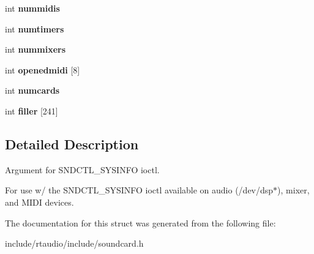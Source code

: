 \begin{DoxyCompactItemize}
\item 
int {\bfseries nummidis}\hypertarget{structoss__sysinfo_a9b22d422ebde2c7830ee392e934187c0}{}\label{structoss__sysinfo_a9b22d422ebde2c7830ee392e934187c0}

\item 
int {\bfseries numtimers}\hypertarget{structoss__sysinfo_ac17e56311498c6c9a1b8e842aaa3d931}{}\label{structoss__sysinfo_ac17e56311498c6c9a1b8e842aaa3d931}

\item 
int {\bfseries nummixers}\hypertarget{structoss__sysinfo_a076a58813962b9fbebb5342c1fa62922}{}\label{structoss__sysinfo_a076a58813962b9fbebb5342c1fa62922}

\item 
int {\bfseries openedmidi} \mbox{[}8\mbox{]}\hypertarget{structoss__sysinfo_af15af7ceb15476a2b130c902544b4b14}{}\label{structoss__sysinfo_af15af7ceb15476a2b130c902544b4b14}

\item 
int {\bfseries numcards}\hypertarget{structoss__sysinfo_a2f1951af991f029af8c828939dea8cb4}{}\label{structoss__sysinfo_a2f1951af991f029af8c828939dea8cb4}

\item 
int {\bfseries filler} \mbox{[}241\mbox{]}\hypertarget{structoss__sysinfo_abf5f5219eb901a17cef315ff22be6773}{}\label{structoss__sysinfo_abf5f5219eb901a17cef315ff22be6773}

\end{DoxyCompactItemize}


\subsection{Detailed Description}
Argument for S\+N\+D\+C\+T\+L\+\_\+\+S\+Y\+S\+I\+N\+FO ioctl. 

For use w/ the S\+N\+D\+C\+T\+L\+\_\+\+S\+Y\+S\+I\+N\+FO ioctl available on audio (/dev/dsp$\ast$), mixer, and M\+I\+DI devices. 

The documentation for this struct was generated from the following file\+:\begin{DoxyCompactItemize}
\item 
include/rtaudio/include/soundcard.\+h\end{DoxyCompactItemize}
